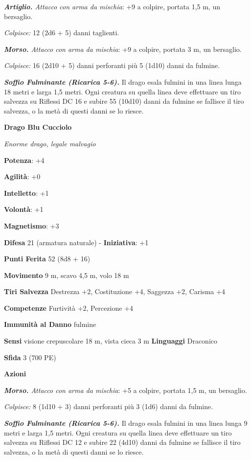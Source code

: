 \begin{multicols}{2}
\emph{\textbf{Artiglio.} Attacco con arma da mischia}: +9 a colpire,
portata 1,5 m, un bersaglio.

\emph{Colpisce:} 12 (2d6 + 5) danni taglienti.

\emph{\textbf{Morso.} Attacco con arma da mischia}: +9 a colpire,
portata 3 m, un bersaglio.

\emph{Colpisce:} 16 (2d10 + 5) danni perforanti più 5 (1d10) danni da
fulmine.

\emph{\textbf{Soffio Fulminante (Ricarica 5-6).}} Il drago esala fulmini
in una linea lunga 18 metri e larga 1,5 metri. Ogni creatura su quella
linea deve effettuare un tiro salvezza su Riflessi DC 16 e subire 55
(10d10) danni da fulmine se fallisce il tiro salvezza, o la metà di
questi danni se lo riesce.

\textbf{Drago Blu Cucciolo}

\emph{Enorme drago, legale malvagio}

\textbf{Potenza}: +4

\textbf{Agilità}: +0

\textbf{Intelletto}: +1

\textbf{Volontà}: +1

\textbf{Magnetismo}: +3

\textbf{Difesa} 21 (armatura naturale) - \textbf{Iniziativa}: +1

\textbf{Punti Ferita} 52 (8d8 + 16)

\textbf{Movimento} 9 m, scavo 4,5 m, volo 18 m

\textbf{Tiri Salvezza} Destrezza +2, Costituzione +4, Saggezza +2,
Carisma +4

\textbf{Competenze} Furtività +2, Percezione +4

\textbf{Immunità al Danno} fulmine

\textbf{Sensi} visione crepuscolare 18 m, vista cieca 3 m
\textbf{Linguaggi} Draconico

\textbf{Sfida} 3 (700 PE)

\textbf{Azioni}

\emph{\textbf{Morso.} Attacco con arma da mischia}: +5 a colpire,
portata 1,5 m, un bersaglio.

\emph{Colpisce:} 8 (1d10 + 3) danni perforanti più 3 (1d6) danni da
fulmine.

\emph{\textbf{Soffio Fulminante (Ricarica 5-6).}} Il drago esala fulmini
in una linea lunga 9 metri e larga 1,5 metri. Ogni creatura su quella
linea deve effettuare un tiro salvezza su Riflessi DC 12 e subire 22
(4d10) danni da fulmine se fallisce il tiro salvezza, o la metà di
questi danni se lo riesce.


\end{multicols}
